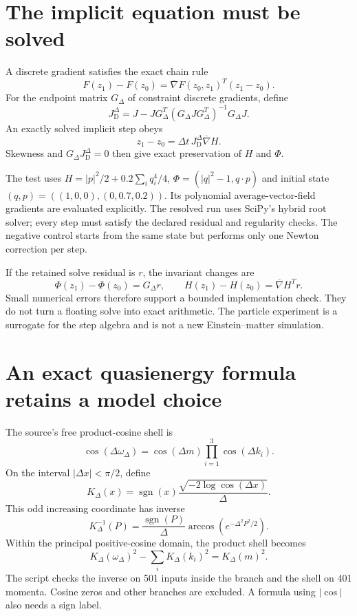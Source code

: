 \clearpage
\section{The implicit equation must be solved}

A discrete gradient satisfies the exact chain rule
\[
F(z_1)-F(z_0)=\overline\nabla F(z_0,z_1)^T(z_1-z_0).
\]
For the endpoint matrix $G_\Delta$ of constraint discrete gradients, define
\[
J_{\mathrm D}^{\Delta}
=J-JG_\Delta^T(G_\Delta JG_\Delta^T)^{-1}G_\Delta J.
\]
An exactly solved implicit step obeys
\[
z_1-z_0=\Delta t\,J_{\mathrm D}^{\Delta}\overline\nabla H.
\]
Skewness and $G_\Delta J_{\mathrm D}^{\Delta}=0$ then give exact preservation of $H$ and $\Phi$.

The test uses $H=|p|^2/2+0.2\sum_iq_i^4/4$, $\Phi=(|q|^2-1,q\cdot p)$ and initial state $(q,p)=((1,0,0),(0,0.7,0.2))$. Its polynomial average-vector-field gradients are evaluated explicitly. The resolved run uses SciPy's hybrid root solver; every step must satisfy the declared residual and regularity checks. The negative control starts from the same state but performs only one Newton correction per step.

If the retained solve residual is $r$, the invariant changes are
\[
\Phi(z_1)-\Phi(z_0)=G_\Delta r,
\qquad H(z_1)-H(z_0)=\overline\nabla H^T r.
\]
Small numerical errors therefore support a bounded implementation check. They do not turn a floating solve into exact arithmetic. The particle experiment is a surrogate for the step algebra and is not a new Einstein--matter simulation.



\clearpage
\section{An exact quasienergy formula retains a model choice}

The source's free product-cosine shell is
\[
\cos(\Delta\omega_\Delta)
=\cos(\Delta m)\prod_{i=1}^3\cos(\Delta k_i).
\]
On the interval $|\Delta x|<\pi/2$, define
\[
K_\Delta(x)=\operatorname{sgn}(x)
\frac{\sqrt{-2\log\cos(\Delta x)}}{\Delta}.
\]
This odd increasing coordinate has inverse
\[
K_\Delta^{-1}(P)=\frac{\operatorname{sgn}(P)}\Delta
\arccos\!\left(e^{-\Delta^2P^2/2}\right).
\]
Within the principal positive-cosine domain, the product shell becomes
\[
K_\Delta(\omega_\Delta)^2-\sum_iK_\Delta(k_i)^2
=K_\Delta(m)^2.
\]
The script checks the inverse on 501 inputs inside the branch and the shell on 401 momenta. Cosine zeros and other branches are excluded. A formula using $|\cos|$ also needs a sign label.

